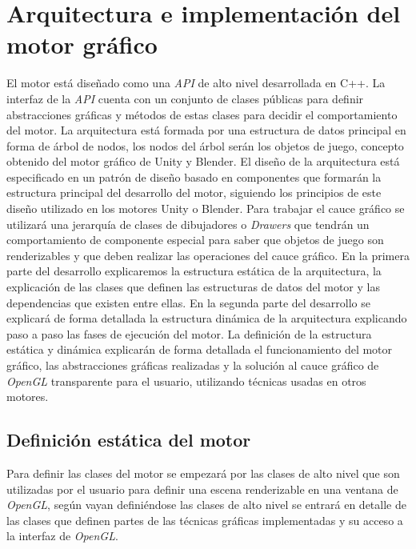 \documentclass[a4paper]{book}
\begin{document}
\cleardoublepage
\chapter{Arquitectura e implementación del motor gráfico}

El motor está diseñado como una \textit{API} de alto nivel desarrollada en C++. La interfaz de la \textit{API} cuenta con un conjunto
de clases públicas para definir abstracciones gráficas y métodos de estas clases para decidir el comportamiento del motor. La arquitectura
está formada por una estructura de datos principal en forma de árbol de nodos, los nodos del árbol serán los objetos de juego, concepto obtenido
del motor gráfico de Unity y Blender. El diseño de la arquitectura está especificado en un patrón de diseño basado en componentes que formarán
la estructura principal del desarrollo del motor, siguiendo los principios de este diseño utilizado en los motores Unity o Blender. Para
trabajar el cauce gráfico se utilizará una jerarquía de clases de dibujadores o \textit{Drawers} que tendrán un comportamiento de componente
especial para saber que objetos de juego son renderizables y que deben realizar las operaciones del cauce gráfico. En la primera parte del
desarrollo explicaremos la estructura estática de la arquitectura, la explicación de las clases que definen las estructuras de datos del
motor y las dependencias que existen entre ellas. En la segunda parte del desarrollo se explicará de forma detallada la estructura dinámica
de la arquitectura explicando paso a paso las fases de ejecución del motor. La definición de la estructura estática y dinámica explicarán
de forma detallada el funcionamiento del motor gráfico, las abstracciones gráficas realizadas y la solución al cauce gráfico de
\textit{OpenGL} transparente para el usuario, utilizando técnicas usadas en otros motores.

\section{Definición estática del motor}
\label{sec:estatica}

Para definir las clases del motor se empezará por las clases de alto nivel que son utilizadas por el usuario para definir una
escena renderizable en una ventana de \textit{OpenGL}, según vayan definiéndose las clases de alto nivel se entrará en detalle de las
clases que definen partes de las técnicas gráficas implementadas y su acceso a la interfaz de \textit{OpenGL}.
\end{document}
